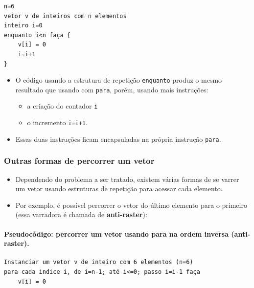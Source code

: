 \documentclass[12pt,a4paper]{article}
\providecommand{\tightlist}{%
      \setlength{\itemsep}{0pt}\setlength{\parskip}{0pt}}
\begin{document}
    \begin{verbatim}
n=6
vetor v de inteiros com n elementos 
inteiro i=0
enquanto i<n faça {
    v[i] = 0
    i=i+1
}
\end{verbatim}

    \begin{itemize}
\tightlist
\item
  O código usando a estrutura de repetição \texttt{enquanto} produz o
  mesmo resultado que usando com \texttt{para}, porém, usando mais
  instruções:

  \begin{itemize}
  \tightlist
  \item
    a criação do contador \texttt{i}
  \item
    o incremento \texttt{i=i+1}.
  \end{itemize}
\item
  Essas duas instruções ficam encapsuladas na própria instrução
  \texttt{para}.
\end{itemize}

    \hypertarget{outras-formas-de-percorrer-um-vetor}{%
\subsubsection{Outras formas de percorrer um
vetor}\label{outras-formas-de-percorrer-um-vetor}}

    \begin{itemize}
\tightlist
\item
  Dependendo do problema a ser tratado, existem várias formas de se
  varrer um vetor usando estruturas de repetição para acessar cada
  elemento.
\item
  Por exemplo, é possível percorrer o vetor do último elemento para o
  primeiro (essa varradora é chamada de \textbf{anti-raster}):
\end{itemize}

    \hypertarget{pseudocuxf3digo-percorrer-um-vetor-usando-para-na-ordem-inversa-anti-raster.}{%
\paragraph{\texorpdfstring{Pseudocódigo: percorrer um vetor usando para
na ordem inversa
(\textbf{anti-raster}).}{Pseudocódigo: percorrer um vetor usando para na ordem inversa (anti-raster).}}\label{pseudocuxf3digo-percorrer-um-vetor-usando-para-na-ordem-inversa-anti-raster.}}

    \begin{verbatim}
Instanciar um vetor v de inteiro com 6 elementos (n=6)
para cada indice i, de i=n-1; até i<=0; passo i=i-1 faça
    v[i] = 0
\end{verbatim}
\end{document}
